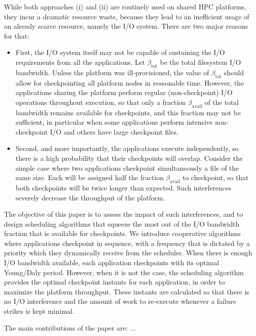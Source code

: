\documentclass[conference]{IEEEtran}
\newcommand{\bandtotal}{\beta_{\text{tot}}}
\newcommand{\bandavail}{\beta_{\text{avail}}}
\begin{document}
While both approaches (i) and (ii) are routinely used on shared HPC
platforms, they incur a dramatic resource waste, because they lead to an
inefficient usage of an already scarce resource, namely the I/O system.
There are two major reasons for that:
\begin{itemize}
  \item First, the I/O system itself may not be capable of sustaining
  the I/O requirements from all the applications. Let $\bandtotal$ be
  the total filesystem I/O bandwidth. Unless the platform was
  ill-provisioned, the value of $\bandtotal$ should allow for
  checkpointing all platform nodes in reasonable time. However, the
  applications sharing the platform perform regular (non-checkpoint) I/O
  operations throughout execution, so that only a fraction $\bandavail$
  of the total  bandwidth remains available for checkpoints, and this
  fraction may not be sufficient, in particular when some applications
  perform intensive non-checkpoint I/O and others have large checkpoint
  files.

  \item Second, and more importantly, the applications execute
  independently, so there is a high probability that their checkpoints
  will overlap. Consider the simple case where two applications
  checkpoint simultaneously a file of the same size. Each will be
  assigned half the fraction $\bandavail$ to checkpoint, so that both
  checkpoints will be twice longer than expected. Such interferences
  severely decrease the throughput of the platform.
\end{itemize}

The objective of this paper is to assess the impact of such
interferences, and to design scheduling algorithms that squeeze the most
out of the I/O bandwidth fraction that is available for checkpoints. We introduce
cooperative algorithms where applications checkpoint in sequence, with a
frequency that is dictated by a priority which they dynamically receive from
the scheduler. When there is enough I/O bandwidth available, each
application checkpoints with its optimal Young/Daly period. However, when it is
not the case, the scheduling algorithm provides the optimal checkpoint
instants for each application, in order to maximize the platform
throughput. These instants are calculated so that there is no I/O interference
and the amount of work to re-execute whenever a failure strikes is kept minimal.

The main contributions of the paper are: ...
\end{document}
